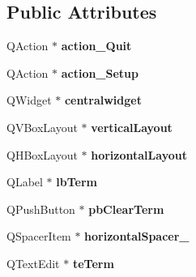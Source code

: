 \subsection*{Public Attributes}
\begin{DoxyCompactItemize}
\item 
\hypertarget{class_ui__mdt_port_term_ad9a01522f2629a8065162cb27afdf474}{
QAction $\ast$ {\bfseries action\_\-Quit}}
\label{class_ui__mdt_port_term_ad9a01522f2629a8065162cb27afdf474}

\item 
\hypertarget{class_ui__mdt_port_term_a0c4f0edb985974b0caad1a02d7f8199e}{
QAction $\ast$ {\bfseries action\_\-Setup}}
\label{class_ui__mdt_port_term_a0c4f0edb985974b0caad1a02d7f8199e}

\item 
\hypertarget{class_ui__mdt_port_term_af8899e8012439f2b421c0e9bb5f57531}{
QWidget $\ast$ {\bfseries centralwidget}}
\label{class_ui__mdt_port_term_af8899e8012439f2b421c0e9bb5f57531}

\item 
\hypertarget{class_ui__mdt_port_term_aa4380c00abcde98629347c978922856f}{
QVBoxLayout $\ast$ {\bfseries verticalLayout}}
\label{class_ui__mdt_port_term_aa4380c00abcde98629347c978922856f}

\item 
\hypertarget{class_ui__mdt_port_term_a550d695251cf000d6de78344601809a2}{
QHBoxLayout $\ast$ {\bfseries horizontalLayout}}
\label{class_ui__mdt_port_term_a550d695251cf000d6de78344601809a2}

\item 
\hypertarget{class_ui__mdt_port_term_a9fe35feb5504ff573d5fa61f81b7e3da}{
QLabel $\ast$ {\bfseries lbTerm}}
\label{class_ui__mdt_port_term_a9fe35feb5504ff573d5fa61f81b7e3da}

\item 
\hypertarget{class_ui__mdt_port_term_a4e5afb56bed669a17b535b33f86d7503}{
QPushButton $\ast$ {\bfseries pbClearTerm}}
\label{class_ui__mdt_port_term_a4e5afb56bed669a17b535b33f86d7503}

\item 
\hypertarget{class_ui__mdt_port_term_a3187cf956072cfa3c15fb7d5d0bd93ad}{
QSpacerItem $\ast$ {\bfseries horizontalSpacer\_}}
\label{class_ui__mdt_port_term_a3187cf956072cfa3c15fb7d5d0bd93ad}

\item 
\hypertarget{class_ui__mdt_port_term_aa4f5b47fb9c324397b9608af1c6e6967}{
QTextEdit $\ast$ {\bfseries teTerm}}
\label{class_ui__mdt_port_term_aa4f5b47fb9c324397b9608af1c6e6967}


\end{DoxyCompactItemize}
